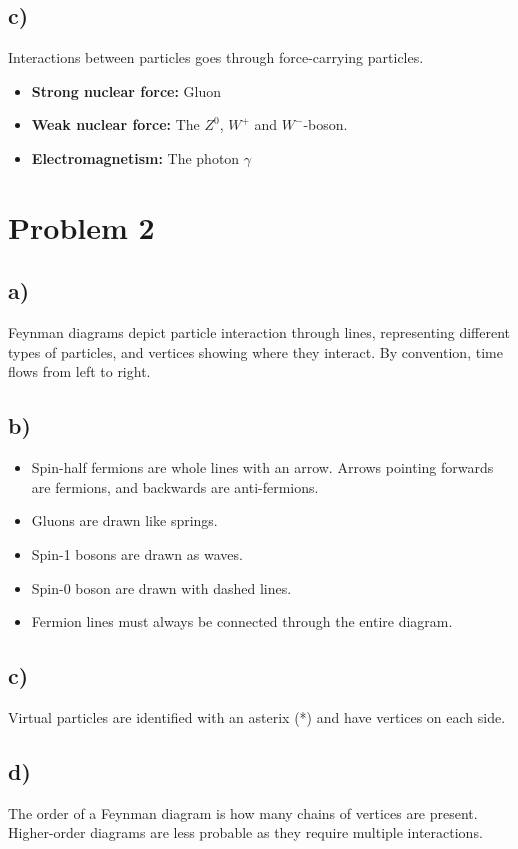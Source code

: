 \documentclass{article}
\begin{document}
\subsection*{c)}
Interactions between particles goes through force-carrying particles. 
\begin{itemize}
    \item \textbf{Strong nuclear force:} Gluon
    \item \textbf{Weak nuclear force:} The $Z^{0}$, $W^{+}$ and $W^{-}$-boson. 
    \item \textbf{Electromagnetism:} The photon $γ$
\end{itemize}

\section*{Problem 2}
\subsection*{a)}
Feynman diagrams depict particle interaction through lines, representing different types of particles, and vertices showing where they interact. By convention, time flows from left to right. 

\subsection*{b)}
\begin{itemize}
    \item Spin-half fermions are whole lines with an arrow. Arrows pointing forwards are fermions, and backwards are anti-fermions. 
    \item Gluons are drawn like springs.
    \item Spin-1 bosons are drawn as waves.
    \item Spin-0 boson are drawn with dashed lines. 
    \item Fermion lines must always be connected through the entire diagram. 
\end{itemize}

\subsection*{c)}
Virtual particles are identified with an asterix (*) and have vertices on each side. 

\subsection*{d)}
The order of a Feynman diagram is how many chains of vertices are present. Higher-order diagrams are less probable as they require multiple interactions. 
\end{document}
